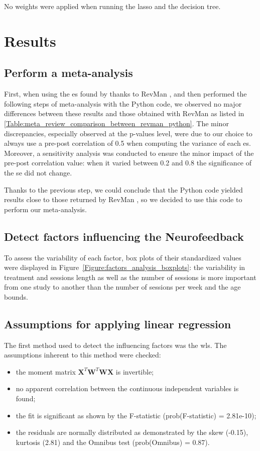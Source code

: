 \documentclass[12pt,a4paper,english]{article}
\begin{document}
No weights were applied when running the \gls{lasso} and the decision tree.

\section{Results}

\subsection{Perform a meta-analysis}

First, when using the \gls{es} found by \citet{Cortese2016} thanks to RevMan \citep{RevMan}, and then performed the following steps 
of meta-analysis with the Python code, we observed no major differences between these results and those obtained with RevMan \citep{RevMan} 
as listed in \ref{Table:meta_review_comparison_between_revman_python}. The minor discrepancies, especially observed at the p-values level,
were due to our choice to always use a pre-post correlation of 0.5 when computing the variance of each \gls{es}. Moreover, a sensitivity 
analysis was conducted to ensure the minor impact of the pre-post correlation value: when it varied between 0.2 and 0.8 the significance 
of the \gls{se} did not change. 

Thanks to the previous step, we could conclude that the Python code yielded results close to those returned by RevMan \citet{RevMan}, so we decided to
use this code to perform our meta-analysis.		

\subsection{Detect factors influencing the Neurofeedback}
		
To assess the variability of each factor, box plots of their standardized values were displayed in Figure~\ref{Figure:factors_analysis_boxplots}: 
the variability in treatment and sessions length as well as the number of sessions is more important from one study to another
than the number of sessions per week and the age bounds.  

\subsection{Assumptions for applying linear regression}

The first method used to detect the influencing factors was the \gls{wls}. The assumptions inherent to this method were checked: 
\begin{itemize}
	\item the moment matrix ${\textbf{X}}^{T}\textbf{W}^{T}\textbf{WX}$ is invertible;
  \item no apparent correlation between the continuous independent variables is found; 
  \item the fit is significant as shown by the F-statistic (prob(F-statistic) = 2.81e-10); 
  \item the residuals are normally distributed as demonstrated by the skew (-0.15), kurtosis (2.81) and the Omnibus test (prob(Omnibus) = 0.87).
\end{itemize} 
\end{document}
